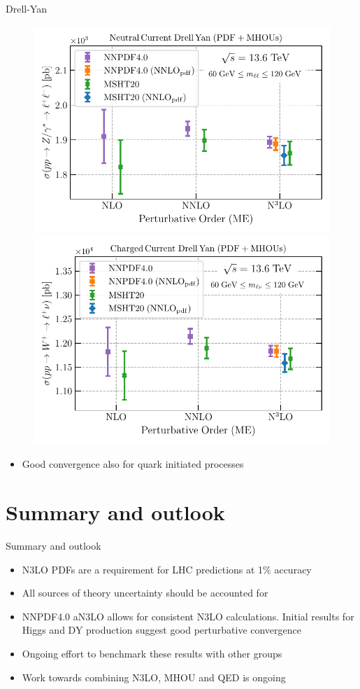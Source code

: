 \documentclass[aspectratio=169, 9pt,t]{beamer}
\begin{document}
\begin{frame}{Drell-Yan}
  \begin{figure}[!t]
    \centering
    \includegraphics[width=0.49\linewidth]{figures/Z_60_120-n3lo.pdf}
    \includegraphics[width=0.49\linewidth]{figures/Wp_60_120-n3lo.pdf}
  \end{figure}
  \begin{itemize}
    \item Good convergence also for quark initiated processes
  \end{itemize}
\end{frame}



\section{Summary and outlook}
\begin{frame}{Summary and outlook}
  \begin{itemize}
    \item N3LO PDFs are a requirement for LHC predictions at 1\% accuracy
    \item All sources of theory uncertainty should be accounted for
    \item NNPDF4.0 aN3LO allows for consistent N3LO calculations. Initial results for Higgs and DY production suggest good perturbative convergence
    \item Ongoing effort to benchmark these results with other groups
    \item Work towards combining N3LO, MHOU and QED is ongoing
  \end{itemize}
\end{frame}
\end{document}
